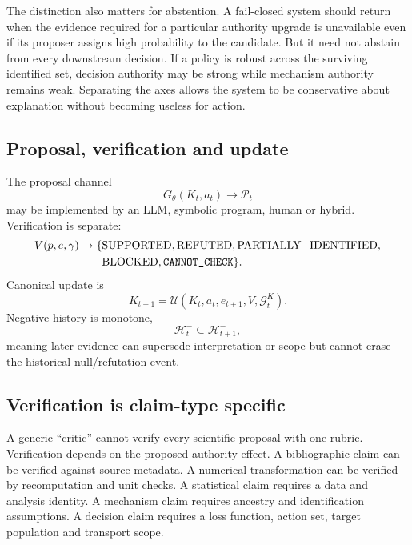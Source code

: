 The distinction also matters for abstention. A fail-closed system should return \CannotCheck{} when the evidence required for a particular authority upgrade is unavailable even if its proposer assigns high probability to the candidate. But it need not abstain from every downstream decision. If a policy is robust across the surviving identified set, decision authority may be strong while mechanism authority remains weak. Separating the axes allows the system to be conservative about explanation without becoming useless for action.

\subsection{Proposal, verification and update}
The proposal channel
\begin{equation}G_\theta(K_t,a_t)\rightarrow\mathcal P_t\end{equation}
may be implemented by an LLM, symbolic program, human or hybrid. Verification is separate:
\begin{equation}
\begin{aligned}
V(p,e,\gamma)\rightarrow\{&\mathrm{SUPPORTED},\mathrm{REFUTED},\mathrm{PARTIALLY\_IDENTIFIED},\\
&\mathrm{BLOCKED},\texttt{CANNOT\_CHECK}\}.
\end{aligned}
\end{equation}
Canonical update is
\begin{equation}K_{t+1}=\mathcal U(K_t,a_t,e_{t+1},V,\mathcal G_t^K).\end{equation}
Negative history is monotone,
\begin{equation}\mathcal H_t^{-}\subseteq\mathcal H_{t+1}^{-},\end{equation}
meaning later evidence can supersede interpretation or scope but cannot erase the historical null/refutation event.

\subsection{Verification is claim-type specific}

A generic ``critic'' cannot verify every scientific proposal with one rubric. Verification depends on the proposed authority effect. A bibliographic claim can be verified against source metadata. A numerical transformation can be verified by recomputation and unit checks. A statistical claim requires a data and analysis identity. A mechanism claim requires ancestry and identification assumptions. A decision claim requires a loss function, action set, target population and transport scope.

